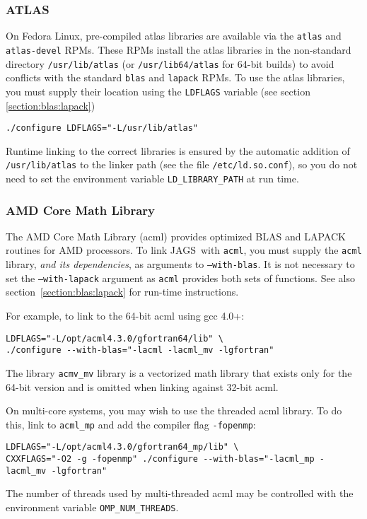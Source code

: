 \documentclass[11pt, a4paper, titlepage]{article}
\newcommand{\JAGS}{\textsf{JAGS}}
\begin{document}
\subsubsection{ATLAS}

On Fedora Linux, pre-compiled atlas libraries are available via the
\texttt{atlas} and \texttt{atlas-devel} RPMs.  These RPMs install the
atlas libraries in the non-standard directory \texttt{/usr/lib/atlas}
(or \texttt{/usr/lib64/atlas} for 64-bit builds) to avoid conflicts
with the standard \texttt{blas} and \texttt{lapack} RPMs. To use the
atlas libraries, you must supply their location using the
\verb+LDFLAGS+ variable (see section \ref{section:blas:lapack})
\begin{verbatim}
./configure LDFLAGS="-L/usr/lib/atlas"
\end{verbatim}
Runtime linking to the correct libraries is ensured by the automatic
addition of \texttt{/usr/lib/atlas} to the linker path (see the file
\texttt{/etc/ld.so.conf}), so you do not need to set the
environment variable \verb+LD_LIBRARY_PATH+ at run time.

\subsubsection{AMD Core Math Library}
\label{section:acml:linux}

The AMD Core Math Library (acml) provides optimized BLAS and LAPACK
routines for AMD processors. To link \JAGS\ with \texttt{acml}, you
must supply the \texttt{acml} library, {\em and its dependencies}, as
arguments to \texttt{--with-blas}.  It is not necessary to set the
\texttt{--with-lapack} argument as \texttt{acml} provides both sets of
functions. See also section~\ref{section:blas:lapack} for run-time
instructions.

For example, to link to the 64-bit acml using gcc 4.0+:
\begin{verbatim}
LDFLAGS="-L/opt/acml4.3.0/gfortran64/lib" \
./configure --with-blas="-lacml -lacml_mv -lgfortran" 
\end{verbatim}
The library \verb+acmv_mv+ library is a vectorized math library that
exists only for the 64-bit version and is omitted when linking against
32-bit acml.

On multi-core systems, you may wish to use the threaded acml library.
To do this, link to \verb+acml_mp+ and add the compiler flag
\verb+-fopenmp+:
\begin{verbatim}
LDFLAGS="-L/opt/acml4.3.0/gfortran64_mp/lib" \
CXXFLAGS="-O2 -g -fopenmp" ./configure --with-blas="-lacml_mp -lacml_mv -lgfortran" 
\end{verbatim}
The number of threads used by multi-threaded acml may be controlled
with the environment variable \verb+OMP_NUM_THREADS+.
\end{document}
